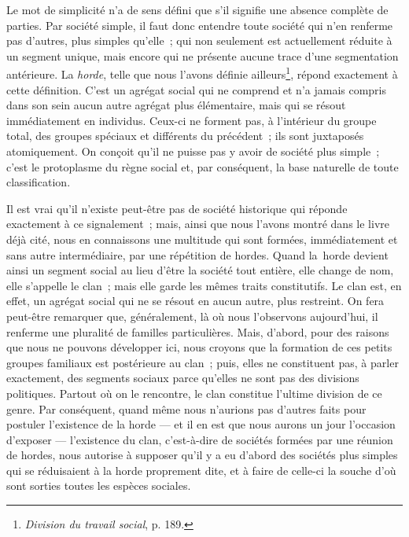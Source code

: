 \documentclass[french,twoside]{book} %
\begin{document}
Le mot de simplicité n’a de sens défini que s’il signifie une absence complète de parties. Par société simple, il faut donc entendre toute société qui n’en renferme pas d’autres, plus simples qu’elle ; qui non seulement est actuellement réduite à un segment unique, mais encore qui ne présente aucune trace d’une segmentation antérieure. La {\itshape horde}, telle que nous l’avons définie ailleurs\footnote{\emph{Division du travail social}, p. 189.}, répond exactement à cette définition. C’est un agrégat social qui ne comprend et n’a jamais compris dans son sein aucun autre agrégat plus élémentaire, mais qui se résout immédiatement en individus. Ceux-ci ne forment pas, à l’intérieur du groupe total, des groupes spéciaux et différents du précédent ; ils sont juxtaposés atomiquement. On conçoit qu’il ne puisse pas y avoir de société plus simple ; c’est le protoplasme du règne social et, par conséquent, la base naturelle de toute classification.\par
Il est vrai qu’il n’existe peut-être pas de société historique qui réponde exactement à ce signalement ; mais, ainsi que nous l’avons montré dans le livre déjà cité, nous en connaissons une multitude qui sont formées, immédiatement et sans autre intermédiaire, par une répétition de hordes. Quand la horde devient ainsi un segment social au lieu d’être la société tout entière, elle change de nom, elle s’appelle le clan ; mais elle garde les mêmes traits constitutifs. Le clan est, en effet, un agrégat social qui ne se résout en aucun autre, plus restreint. On fera peut-être remarquer que, généralement, là où nous l’observons aujourd’hui, il renferme une pluralité de familles particulières. Mais, d’abord, pour des raisons que nous ne pouvons développer ici, nous croyons que la formation de ces petits groupes familiaux est postérieure au clan ; puis, elles ne constituent pas, à parler exactement, des segments sociaux parce qu’elles ne sont pas des divisions politiques. Partout où on le rencontre, le clan constitue l’ultime division de ce genre. Par conséquent, quand même nous n’aurions pas d’autres faits pour postuler l’existence de la horde — et il en est que nous aurons un jour l’occasion d’exposer — l’existence du clan, c’est-à-dire de sociétés formées par une réunion de hordes, nous autorise à supposer qu’il y a eu d’abord des sociétés plus simples qui se réduisaient à la horde proprement dite, et à faire de celle-ci la souche d’où sont sorties toutes les espèces sociales.\par
\end{document}
